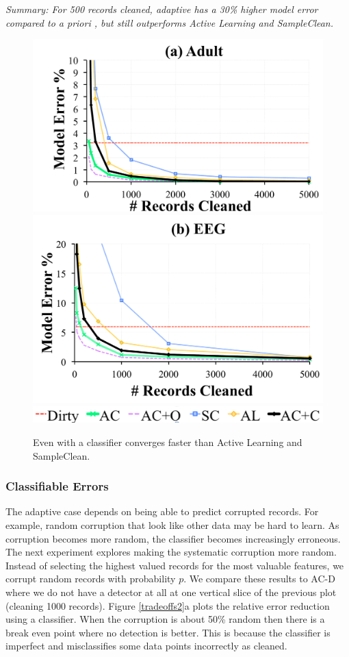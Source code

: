 \vspace{0.25em}

\noindent \emph{Summary: For 500 records cleaned, adaptive \sys has a 30\% higher model error compared to a priori \sys, but still outperforms Active Learning and SampleClean.}

\begin{figure}[t]
\centering\vspace{-1em}
 \includegraphics[width=0.49\columnwidth]{exp/exp11a.pdf}
 \includegraphics[width=0.49\columnwidth]{exp/exp11b.pdf}
 \includegraphics[width=0.49\columnwidth]{exp/legend-11.png}\vspace{-0.5em}
 \caption{Even with a classifier \sys converges faster than Active Learning and SampleClean. \label{pred-perf}}\vspace{-1.0em}
\end{figure}


\subsubsection{Classifiable Errors}
The adaptive case depends on being able to predict corrupted records.
For example, random corruption that look like other data may be hard to learn.
As corruption becomes more random, the classifier becomes increasingly erroneous.
The next experiment explores making the systematic corruption more random.
Instead of selecting the highest valued records for the most valuable features, we corrupt random records with probability $p$. 
We compare these results to AC-D where we do not have a detector at all at one vertical slice of the previous plot (cleaning 1000 records).
Figure \ref{tradeoffs2}a plots the relative error reduction using a classifier.
When the corruption is about 50\% random then there is a break even point where no detection is better.
This is because the classifier is imperfect and misclassifies some data points incorrectly as cleaned.

